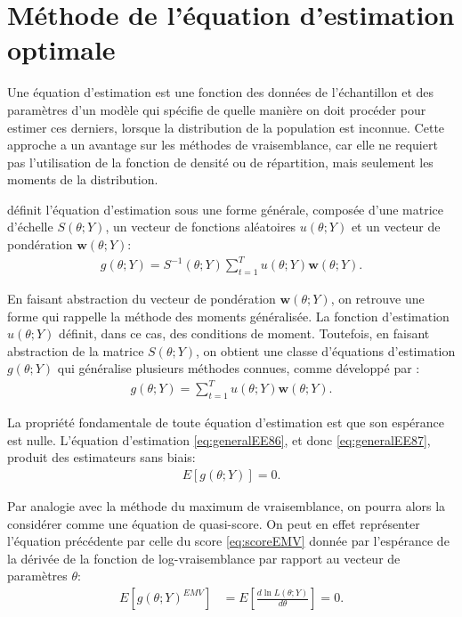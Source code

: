 \chapter{Méthode de l'équation d'estimation
  optimale} %

Une équation d'estimation est une fonction des données de
l'échantillon et des paramètres d'un modèle qui spécifie de quelle
manière on doit procéder pour estimer ces derniers, lorsque la
distribution de la population est inconnue. Cette approche a un
avantage sur les méthodes de vraisemblance, car elle ne requiert pas
l'utilisation de la fonction de densité ou de répartition, mais
seulement les moments de la distribution. \citep{everitt2006cambridge}

\cite{crowder1986consistency} définit l'équation d'estimation sous une
forme générale, composée d'une matrice d'échelle $S(\theta;Y)$, un
vecteur de fonctions aléatoires $u(\theta;Y)$ et un vecteur de
pondération $\mathbf{w}(\theta;Y)$:
\begin{align}
  \label{eq:generalEE86}
  g(\theta;Y) = S^{-1}(\theta;Y) \sum_{t=1}^T u(\theta;Y)
  \mathbf{w}(\theta;Y).
\end{align}

En faisant abstraction du vecteur de pondération
$\mathbf{w}(\theta;Y)$, on retrouve une forme qui rappelle la méthode
des moments généralisée. La fonction d'estimation $u(\theta;Y)$
définit, dans ce cas, des conditions de moment.  Toutefois, en faisant
abstraction de la matrice $S(\theta;Y)$, on obtient une classe
d'équations d'estimation $g(\theta;Y)$ qui généralise plusieurs
méthodes connues, comme développé par \cite{crowder1987linear}:
\begin{align}
  \label{eq:generalEE87}
  g(\theta;Y) = \sum_{t=1}^T u(\theta;Y) \mathbf{w}(\theta;Y).
\end{align}

La propriété fondamentale de toute équation d'estimation est que son
espérance est nulle. L'équation d'estimation \eqref{eq:generalEE86},
et donc \eqref{eq:generalEE87}, produit des estimateurs sans biais:
\begin{align}
  \label{eq:EEsansbiais}
  E\left[ g(\theta;Y) \right] = 0.
\end{align}

Par analogie avec la méthode du maximum de vraisemblance, on pourra
alors la considérer comme une équation de quasi-score. On peut en
effet représenter l'équation précédente par celle du score
\eqref{eq:scoreEMV} donnée par l'espérance de la dérivée de la
fonction de log-vraisemblance par rapport au vecteur de paramètres
$\theta$:
\begin{align}
  \label{eq:scoreEMV}
  E\left[g\left(\theta;Y \right)^{EMV}\right] &= E\left[\frac{d \ln
      L\left(\theta;Y\right)}{d\theta}\right] = 0.
\end{align}

